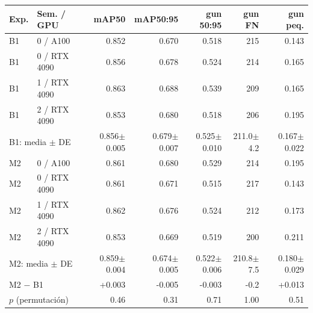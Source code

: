 \begin{tabular}{llrrrrr}\toprule
Exp. & Sem. / GPU & mAP50 & mAP50:95 & gun 50:95 & gun FN & gun peq. \\ \midrule
B1 & 0 / A100 & 0.852 & 0.670 & 0.518 & 215 & 0.143 \\
B1 & 0 / RTX 4090 & 0.856 & 0.678 & 0.524 & 214 & 0.165 \\
B1 & 1 / RTX 4090 & 0.863 & 0.688 & 0.539 & 209 & 0.165 \\
B1 & 2 / RTX 4090 & 0.853 & 0.680 & 0.518 & 206 & 0.195 \\
\multicolumn{2}{l}{B1: media $\pm$ DE} & 0.856$\pm$0.005 & 0.679$\pm$0.007 & 0.525$\pm$0.010 & 211.0$\pm$4.2 & 0.167$\pm$0.022 \\ \midrule
M2 & 0 / A100 & 0.861 & 0.680 & 0.529 & 214 & 0.195 \\
M2 & 0 / RTX 4090 & 0.861 & 0.671 & 0.515 & 217 & 0.143 \\
M2 & 1 / RTX 4090 & 0.862 & 0.676 & 0.524 & 212 & 0.173 \\
M2 & 2 / RTX 4090 & 0.853 & 0.669 & 0.519 & 200 & 0.211 \\
\multicolumn{2}{l}{M2: media $\pm$ DE} & 0.859$\pm$0.004 & 0.674$\pm$0.005 & 0.522$\pm$0.006 & 210.8$\pm$7.5 & 0.180$\pm$0.029 \\ \midrule
\multicolumn{2}{l}{M2 $-$ B1} & +0.003 & -0.005 & -0.003 & -0.2 & +0.013 \\
\multicolumn{2}{l}{$p$ (permutación)} & 0.46 & 0.31 & 0.71 & 1.00 & 0.51 \\ \bottomrule
\end{tabular}
